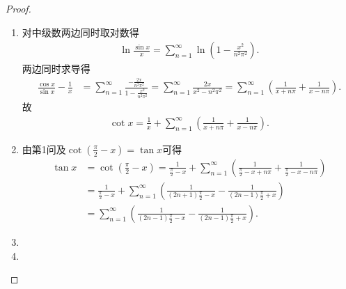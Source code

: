\documentclass[../../main.tex]{subfiles}%
\begin{document}
\begin{proof}
\begin{enumerate}
\item 对中级数两边同时取对数得
\begin{align*}
\ln \frac{\sin x}{x} = \sum_{n=1}^{\infty} \ln \left(1 - \frac{x^2}{n^2\pi^2}\right).
\end{align*}
两边同时求导得
\begin{align*}
\frac{\cos x}{\sin x} - \frac{1}{x} &= \sum_{n=1}^{\infty} \frac{-\frac{2x}{n^2\pi^2}}{1 - \frac{x^2}{n^2\pi^2}} = \sum_{n=1}^{\infty} \frac{2x}{x^2 - n^2\pi^2} = \sum_{n=1}^{\infty} \left( \frac{1}{x + n\pi} + \frac{1}{x - n\pi} \right).
\end{align*}
故
\begin{align*}
\cot x = \frac{1}{x} + \sum_{n=1}^{\infty} \left( \frac{1}{x + n\pi} + \frac{1}{x - n\pi} \right).
\end{align*}

\item 由第1问及$\cot \left( \frac{\pi}{2}-x \right) =\tan x$可得
\begin{align*}
\tan x&=\cot \left( \frac{\pi}{2}-x \right) =\frac{1}{\frac{\pi}{2}-x}+\sum_{n=1}^{\infty}{\left( \frac{1}{\frac{\pi}{2}-x+n\pi}+\frac{1}{\frac{\pi}{2}-x-n\pi} \right)}\\
&=\frac{1}{\frac{\pi}{2}-x}+\sum_{n=1}^{\infty}{\left( \frac{1}{\left( 2n+1 \right) \frac{\pi}{2}-x}-\frac{1}{\left( 2n-1 \right) \frac{\pi}{2}+x} \right)}\\
&=\sum_{n=1}^{\infty}{\left( \frac{1}{\left( 2n-1 \right) \frac{\pi}{2}-x}-\frac{1}{\left( 2n-1 \right) \frac{\pi}{2}+x} \right)}.
\end{align*}

\item 

\item 
\end{enumerate}

\end{proof}
\end{document}

